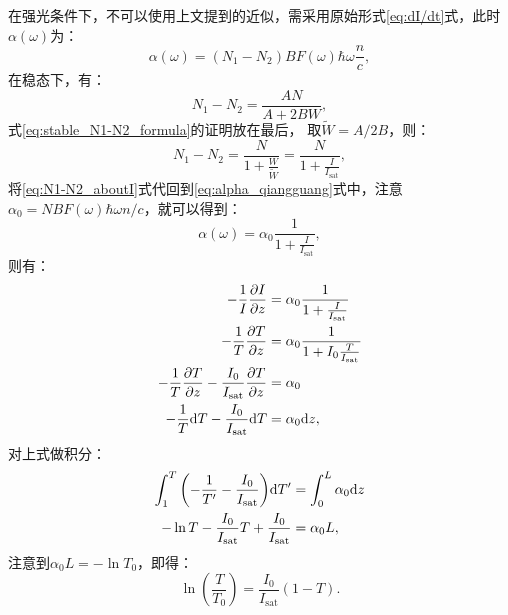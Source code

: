 \documentclass[12pt, a4paper, oneside]{ctexart}
\begin{document}
	在强光条件下，不可以使用上文提到的近似，需采用原始形式\eqref{eq:dI/dt}式，此时$\alpha(\omega)$为：
	\begin{equation}
		\alpha(\omega) = (N_1 - N_2)  B F(\omega) \hbar \omega  \frac{n}{c},
		\label{eq:alpha_qiangguang}
	\end{equation}
	在稳态下，有：
	\begin{equation}
		N_1 - N_2 = \frac{AN}{A + 2BW },
		\label{eq:stable_N1-N2_formula}
	\end{equation}
	式\eqref{eq:stable_N1-N2_formula}的证明放在最后，
	取$\widetilde{W} = A/2B$，则：
	\begin{equation}
		N_1 - N_2 = \frac{N}{1 + \frac{W}{\widetilde{W}} } = \frac{N}{1 + \frac{I}{I_{\mathrm{sat}}} },
		\label{eq:N1-N2_aboutI}
	\end{equation}
	将\eqref{eq:N1-N2_aboutI}式代回到\eqref{eq:alpha_qiangguang}式中，注意$\alpha_0 = NB F(\omega) \hbar \omega n/c$，就可以得到：
	\begin{equation}
		\alpha(\omega) = \alpha_0 \frac{1}{1 + \frac{I}{I_{\mathrm{sat}}} },
	\end{equation}
	则有：
	\begin{align*}
		-\frac{1}{I} \pdv{I}{z} &= \alpha_0 \frac{1}{1 + \frac{I}{I_{\mathrm{sat}}} } \\
		-\frac{1}{T} \pdv{T}{z}  &= \alpha_0 \frac{1}{1 + I_0\frac{T}{I_{\mathrm{sat}}} } \\
		-\frac{1}{T} \pdv{T}{z} - \frac{I_0}{I_{\mathrm{sat}}} \pdv{T}{z} &= \alpha_0 \\
		-\frac{1}{T} \mathrm{d}T - \frac{I_0}{I_{\mathrm{sat}}} \mathrm{d}T &= \alpha_0 \mathrm{d}z,
	\end{align*}
	对上式做积分：
	\begin{align*}
		\int_{1}^{T} \qty(-\frac{1}{T'}  - \frac{I_0}{I_{\mathrm{sat}}}) \mathrm{d}T' &= \int_{0}^{L} \alpha_0 \mathrm{d}z \\
		- \ln T - \frac{I_0}{I_{\mathrm{sat}}}T + \frac{I_0}{I_{\mathrm{sat}}} &= \alpha_0 L,
	\end{align*}
	注意到$\alpha_0L = -\ln T_0$，即得：
	\begin{equation}
		\ln(\frac{T}{T_0}) = \frac{I_0}{I_{\mathrm{sat}}}(1-T).
	\end{equation}
	
\end{document}
